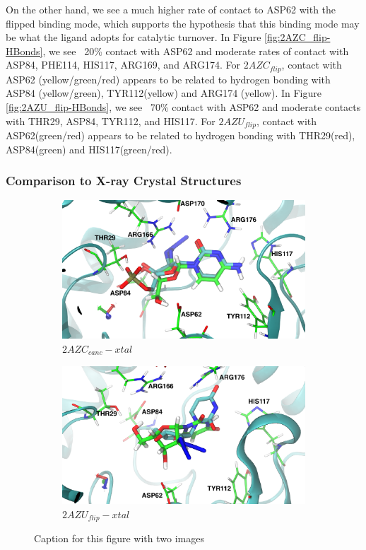 \documentclass[fleqn,10pt]{wlscirep}
\begin{document}
On the other hand, we see a much higher rate of contact to ASP62 with the flipped binding mode, which supports the hypothesis that this binding mode may be what the ligand adopts for catalytic turnover.
In Figure \ref{fig:2AZC_flip-HBonds}, we see ~20\% contact with ASP62 and moderate rates of contact with ASP84, PHE114, HIS117, ARG169, and ARG174.
For $2AZC_{flip}$, contact with ASP62 (yellow/green/red) appears to be related to hydrogen bonding with ASP84 (yellow/green), TYR112(yellow) and ARG174 (yellow).
In Figure \ref{fig:2AZU_flip-HBonds}, we see ~70\% contact with ASP62 and moderate contacts with THR29, ASP84, TYR112, and HIS117.
For $2AZU_{flip}$, contact with ASP62(green/red) appears to be related to hydrogen bonding with THR29(red), ASP84(green) and HIS117(green/red).

\subsubsection{Comparison to X-ray Crystal Structures}

\begin{figure}[!ht]
\centering
\begin{subfigure}{.5\textwidth}
  \centering
  \includegraphics[width=.9\linewidth]{xtal/2AZC_canc-xtal_front.pdf}
  \caption{$2AZC_{canc}-xtal$}
  \label{fig:2AZC-xtal}
\end{subfigure}%
\begin{subfigure}{.5\textwidth}
  \centering
  \includegraphics[width=.9\linewidth]{xtal/2AZU_flip-xtal_front.pdf}
  \caption{$2AZU_{flip}-xtal$}
  \label{fig:2AZU-xtal}
\end{subfigure}
\caption{Caption for this figure with two images}
\label{fig:xtal}
\end{figure}
\end{document}
